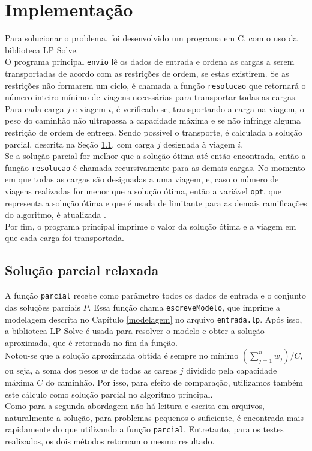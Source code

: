 \documentclass{article}
\begin{document}
\section{Implementação}
Para solucionar o problema, foi desenvolvido um programa em C, com o uso da biblioteca LP Solve.\\
O programa principal \texttt{envio} lê os dados de entrada e ordena as cargas a serem transportadas de acordo com as restrições de ordem, se estas existirem. Se as restrições não formarem um ciclo, é chamada a função \texttt{resolucao} que retornará o número inteiro mínimo de viagens necessárias para transportar todas as cargas.\\
Para cada carga $j$ e viagem $i$, é verificado se, transportando a carga na viagem, o peso do caminhão não ultrapassa a capacidade máxima e se não infringe alguma restrição de ordem de entrega. Sendo possível o transporte, é calculada a solução parcial, descrita na Seção \ref{parcial}, com carga $j$ designada à viagem $i$.\\
Se a solução parcial for melhor que a solução ótima até então encontrada, então a função \texttt{resolucao} é chamada recursivamente para as demais cargas. No momento em que todas as cargas são designadas a uma viagem, e, caso o número de viagens realizadas for menor que a solução ótima, então a variável \texttt{opt}, que representa a solução ótima e que é usada de limitante para as demais ramificações do algoritmo, é atualizada .\\
Por fim, o programa principal imprime o valor da solução ótima e a viagem em que cada carga foi transportada.\\

\subsection{Solução parcial relaxada} \label{parcial}
A função \texttt{parcial} recebe como parâmetro todos os dados de entrada e o conjunto das soluções parciais $P$. Essa função chama \texttt{escreveModelo}, que imprime a modelagem descrita no Capítulo \ref{modelagem} no arquivo \texttt{entrada.lp}. Após isso, a biblioteca LP Solve é usada para resolver o modelo e obter a solução aproximada, que é retornada no fim da função.\\
Notou-se que a solução aproximada obtida é sempre no mínimo $(\sum_{j=1}^n w_j)/C$, ou seja, a soma dos pesos $w$ de todas as cargas $j$ dividido pela capacidade máxima $C$ do caminhão. Por isso, para efeito de comparação, utilizamos também este cálculo como solução parcial no algoritmo principal.\\
Como para a segunda abordagem não há leitura e escrita em arquivos, naturalmente a solução, para problemas pequenos o suficiente, é encontrada mais rapidamente do que utilizando a função \texttt{parcial}. Entretanto, para os testes realizados, os dois métodos retornam o mesmo resultado.
\end{document}
